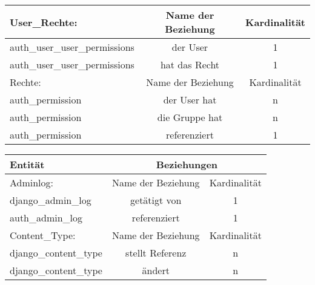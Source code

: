 \begin{tabular}[ht]{|l||c|c|}
  User\_Rechte:  & Name der Beziehung &  Kardinalit\"at\\
  \hline\hline
  auth\_user\_user\_permissions & der User & 1 \\
  \hline
  auth\_user\_user\_permissions & hat das Recht & 1 \\
  \hline\hline\hline 
  
  Rechte:  & Name der Beziehung &  Kardinalit\"at\\
  \hline\hline
  auth\_permission & der User hat  & n \\
  \hline
  auth\_permission & die Gruppe hat & n \\
  \hline
  auth\_permission & referenziert & 1 \\
  \hline
\end{tabular}

\begin{tabular}[ht]{|l||c|c|}
  \hline
  Entit\"at & \multicolumn{2}{c|}{Beziehungen} \\
  \hline\hline\hline
  
  Adminlog:  & Name der Beziehung &  Kardinalit\"at\\
  \hline\hline
  django\_admin\_log & getätigt von  & 1 \\
  \hline
  auth\_admin\_log & referenziert & 1 \\
  \hline\hline\hline
  
  Content\_Type:  & Name der Beziehung &  Kardinalit\"at\\
  \hline\hline
  django\_content\_type & stellt Referenz & n \\
  \hline
  django\_content\_type & ändert & n \\
  \hline\hline\hline
\end{tabular}


